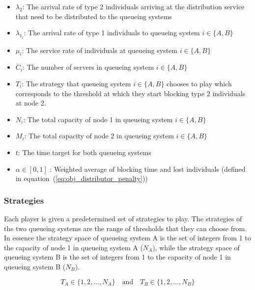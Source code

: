 \begin{itemize}
    \item \(\lambda_2\): The arrival rate of type 2 individuals arriving at the
    distribution service that need to be distributed to the queueing systems
    \item \(\lambda_{1_i}\): The arrival rate of type 1 individuals to queueing
    system \(i\in\{A, B\}\)
    \item \(\mu_i\): The service rate of individuals at queueing system
    \(i\in\{A, B\}\)
    \item \(C_i\): The number of servers in queueing system \(i\in\{A, B\}\)
    \item \(T_i\): The strategy that queueing system \(i\in\{A, B\} \) chooses
    to play which corresponds to the threshold at which they start blocking
    type 2 individuals at node 2.
    \item \(N_i\): The total capacity of node 1 in queueing system
    \(i\in\{A, B\}\)
    \item \(M_i\): The total capacity of node 2 in queueing system
    \(i\in\{A, B\}\)
    \item \(t\): The time target for both queueing systems
    \item \(\alpha \in [0, 1]\) : Weighted average of blocking time and
    lost individuals (defined in equation~(\ref{eq:obj_distributor_penalty}))
\end{itemize}

\subsubsection{Strategies}\label{sec:game_strategies}

Each player is given a predetermined set of strategies to play.
The strategies of the two queueing systems are the range of thresholds that they
can choose from.
In essence the strategy space of queueing system A is the set of integers from
1 to the capacity of node 1 in queueing system A (\(N_A\)), while the
strategy space of queueing system B is the set of integers from 1 to the
capacity of node 1 in queueing system B (\(N_B\)).

\begin{equation}\label{eq:game_strategy_space_queueing_systems}
    T_A \in \{1, 2, \ldots, N_A\} \quad \text{and} \quad
    T_B \in \{1, 2, \ldots, N_B\}
\end{equation}

